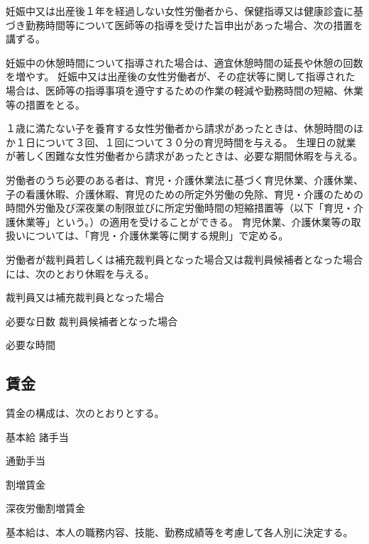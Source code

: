 \documentclass[10pt,a4paper,uplatex]{jsarticle}
\begin{document}
\term
妊娠中又は出産後１年を経過しない女性労働者から、保健指導又は健康診査に基づき勤務時間等について医師等の指導を受けた旨申出があった場合、次の措置を講ずる。
\begin{enumerate}
    \itm 妊娠中の休憩時間について指導された場合は、適宜休憩時間の延長や休憩の回数を増やす。
    \itm 妊娠中又は出産後の女性労働者が、その症状等に関して指導された場合は、医師等の指導事項を遵守するための作業の軽減や勤務時間の短縮、休業等の措置をとる。
\end{enumerate}

１歳に満たない子を養育する女性労働者から請求があったときは、休憩時間のほか１日について３回、１回について３０分の育児時間を与える。
\term
生理日の就業が著しく困難な女性労働者から請求があったときは、必要な期間休暇を与える。

労働者のうち必要のある者は、育児・介護休業法に基づく育児休業、介護休業、子の看護休暇、介護休暇、育児のための所定外労働の免除、育児・介護のための時間外労働及び深夜業の制限並びに所定労働時間の短縮措置等（以下「育児・介護休業等」という。）の適用を受けることができる。
\term
育児休業、介護休業等の取扱いについては、「育児・介護休業等に関する規則」で定める。

労働者が裁判員若しくは補充裁判員となった場合又は裁判員候補者となった場合には、次のとおり休暇を与える。
\begin{enumerate}
    \itm 裁判員又は補充裁判員となった場合 \par 必要な日数
    \itm 裁判員候補者となった場合\par 必要な時間
\end{enumerate}


\subsection{賃金}

賃金の構成は、次のとおりとする。
\begin{enumerate}
    \itm 基本給
    \itm 諸手当
    \begin{enumerate}
        \itm 通勤手当
    \end{enumerate}
    \itm 割増賃金
    \begin{enumerate}
        \itm 深夜労働割増賃金
    \end{enumerate}
\end{enumerate}

基本給は、本人の職務内容、技能、勤務成績等を考慮して各人別に決定する。
\end{document}
